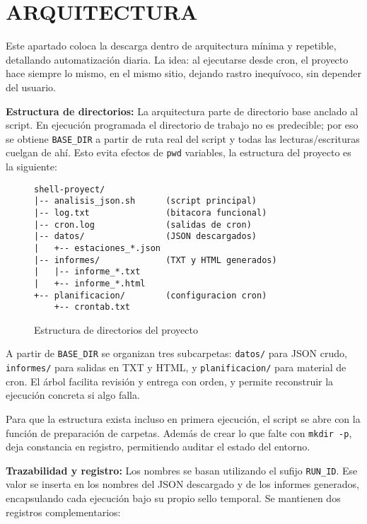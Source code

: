 \chapter{ARQUITECTURA}

Este apartado coloca la descarga dentro de arquitectura mínima y repetible, detallando automatización diaria. La idea: al ejecutarse desde cron, el proyecto hace siempre lo mismo, en el mismo sitio, dejando rastro inequívoco, sin depender del usuario.

\textbf{Estructura de directorios:} La arquitectura parte de directorio base anclado al script. En ejecución programada el directorio de trabajo no es predecible; por eso se obtiene \texttt{BASE\_DIR} a partir de ruta real del script y todas las lecturas/escrituras cuelgan de ahí. Esto evita efectos de \texttt{pwd} variables, la estructura del proyecto es la siguiente:

\begin{figure}[H]
  \centering
  \footnotesize
  \begin{verbatim}
shell-proyect/
|-- analisis_json.sh      (script principal)
|-- log.txt               (bitacora funcional)
|-- cron.log              (salidas de cron)
|-- datos/                (JSON descargados)
|   +-- estaciones_*.json
|-- informes/             (TXT y HTML generados)
|   |-- informe_*.txt
|   +-- informe_*.html
+-- planificacion/        (configuracion cron)
    +-- crontab.txt
\end{verbatim}
  \caption{Estructura de directorios del proyecto}
\end{figure}

A partir de \texttt{BASE\_DIR} se organizan tres subcarpetas: \texttt{datos/} para JSON crudo, \texttt{informes/} para salidas en TXT y HTML, y \texttt{planificacion/} para material de cron. El árbol facilita revisión y entrega con orden, y permite reconstruir la ejecución concreta si algo falla.

Para que la estructura exista incluso en primera ejecución, el script se abre con la función de preparación de carpetas. Además de crear lo que falte con \texttt{mkdir -p}, deja constancia en registro, permitiendo auditar el estado del entorno.

\textbf{Trazabilidad y registro:} Los nombres se basan utilizando el sufijo \texttt{RUN\_ID}. Ese valor se inserta en los nombres del JSON descargado y de los informes generados, encapsulando cada ejecución bajo su propio sello temporal. Se mantienen dos registros complementarios:


